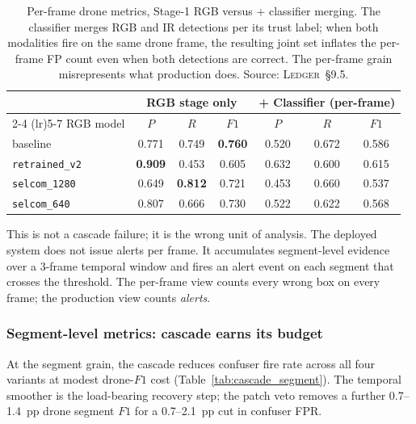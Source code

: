 \begin{table}[htbp]
    \centering
    \caption{Per-frame drone metrics, Stage-1 RGB versus + classifier merging. The classifier merges RGB and IR detections per its trust label; when both modalities fire on the same drone frame, the resulting joint set inflates the per-frame FP count even when both detections are correct. The per-frame grain misrepresents what production does. Source: \textsc{Ledger}~\S9.5.}
    \label{tab:cascade_perframe}
    \begin{tabular}{lcccccc}
        \toprule
        & \multicolumn{3}{c}{RGB stage only} & \multicolumn{3}{c}{+ Classifier (per-frame)} \\
        \cmidrule(lr){2-4} \cmidrule(lr){5-7}
        RGB model & $P$ & $R$ & $F1$ & $P$ & $R$ & $F1$ \\
        \midrule
        baseline           & 0.771 & 0.749 & \textbf{0.760} & 0.520 & 0.672 & 0.586 \\
        \texttt{retrained\_v2} & \textbf{0.909} & 0.453 & 0.605 & 0.632 & 0.600 & 0.615 \\
        \texttt{selcom\_1280}  & 0.649 & \textbf{0.812} & 0.721 & 0.453 & 0.660 & 0.537 \\
        \texttt{selcom\_640}   & 0.807 & 0.666 & 0.730 & 0.522 & 0.622 & 0.568 \\
        \bottomrule
    \end{tabular}
\end{table}

This is not a cascade failure; it is the wrong unit of analysis. The deployed system does not issue alerts per frame. It accumulates segment-level evidence over a 3-frame temporal window and fires an alert event on each segment that crosses the threshold. The per-frame view counts every wrong box on every frame; the production view counts \emph{alerts}.

\subsubsection{Segment-level metrics: cascade earns its budget}

At the segment grain, the cascade reduces confuser fire rate across all four variants at modest drone-$F1$ cost (Table~\ref{tab:cascade_segment}). The temporal smoother is the load-bearing recovery step; the patch veto removes a further 0.7--1.4~pp drone segment $F1$ for a 0.7--2.1~pp cut in confuser FPR.

